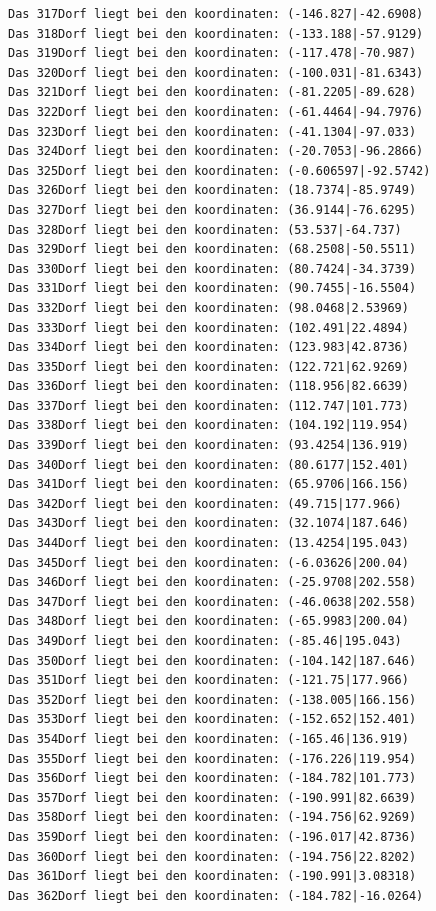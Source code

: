 \documentclass{article}
\begin{document}
\begin{verbatim}
Das 317Dorf liegt bei den koordinaten: (-146.827|-42.6908)
Das 318Dorf liegt bei den koordinaten: (-133.188|-57.9129)
Das 319Dorf liegt bei den koordinaten: (-117.478|-70.987)
Das 320Dorf liegt bei den koordinaten: (-100.031|-81.6343)
Das 321Dorf liegt bei den koordinaten: (-81.2205|-89.628)
Das 322Dorf liegt bei den koordinaten: (-61.4464|-94.7976)
Das 323Dorf liegt bei den koordinaten: (-41.1304|-97.033)
Das 324Dorf liegt bei den koordinaten: (-20.7053|-96.2866)
Das 325Dorf liegt bei den koordinaten: (-0.606597|-92.5742)
Das 326Dorf liegt bei den koordinaten: (18.7374|-85.9749)
Das 327Dorf liegt bei den koordinaten: (36.9144|-76.6295)
Das 328Dorf liegt bei den koordinaten: (53.537|-64.737)
Das 329Dorf liegt bei den koordinaten: (68.2508|-50.5511)
Das 330Dorf liegt bei den koordinaten: (80.7424|-34.3739)
Das 331Dorf liegt bei den koordinaten: (90.7455|-16.5504)
Das 332Dorf liegt bei den koordinaten: (98.0468|2.53969)
Das 333Dorf liegt bei den koordinaten: (102.491|22.4894)
Das 334Dorf liegt bei den koordinaten: (123.983|42.8736)
Das 335Dorf liegt bei den koordinaten: (122.721|62.9269)
Das 336Dorf liegt bei den koordinaten: (118.956|82.6639)
Das 337Dorf liegt bei den koordinaten: (112.747|101.773)
Das 338Dorf liegt bei den koordinaten: (104.192|119.954)
Das 339Dorf liegt bei den koordinaten: (93.4254|136.919)
Das 340Dorf liegt bei den koordinaten: (80.6177|152.401)
Das 341Dorf liegt bei den koordinaten: (65.9706|166.156)
Das 342Dorf liegt bei den koordinaten: (49.715|177.966)
Das 343Dorf liegt bei den koordinaten: (32.1074|187.646)
Das 344Dorf liegt bei den koordinaten: (13.4254|195.043)
Das 345Dorf liegt bei den koordinaten: (-6.03626|200.04)
Das 346Dorf liegt bei den koordinaten: (-25.9708|202.558)
Das 347Dorf liegt bei den koordinaten: (-46.0638|202.558)
Das 348Dorf liegt bei den koordinaten: (-65.9983|200.04)
Das 349Dorf liegt bei den koordinaten: (-85.46|195.043)
Das 350Dorf liegt bei den koordinaten: (-104.142|187.646)
Das 351Dorf liegt bei den koordinaten: (-121.75|177.966)
Das 352Dorf liegt bei den koordinaten: (-138.005|166.156)
Das 353Dorf liegt bei den koordinaten: (-152.652|152.401)
Das 354Dorf liegt bei den koordinaten: (-165.46|136.919)
Das 355Dorf liegt bei den koordinaten: (-176.226|119.954)
Das 356Dorf liegt bei den koordinaten: (-184.782|101.773)
Das 357Dorf liegt bei den koordinaten: (-190.991|82.6639)
Das 358Dorf liegt bei den koordinaten: (-194.756|62.9269)
Das 359Dorf liegt bei den koordinaten: (-196.017|42.8736)
Das 360Dorf liegt bei den koordinaten: (-194.756|22.8202)
Das 361Dorf liegt bei den koordinaten: (-190.991|3.08318)
Das 362Dorf liegt bei den koordinaten: (-184.782|-16.0264)

\end{verbatim}
\end{document}
